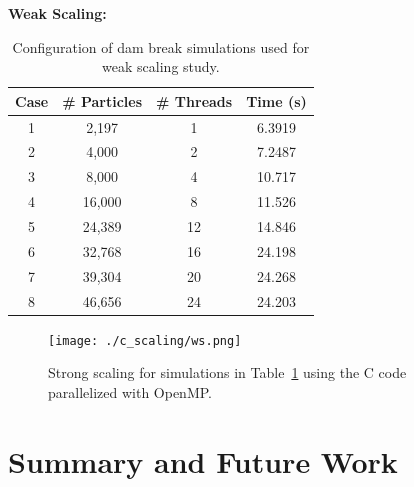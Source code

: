 \documentclass{scrartcl}
\begin{document}
    \textbf{Weak Scaling:}
    \begin{table}
    	\begin{center}
    		\begin{tabular}{| c | c | c | c |}
    			\hline
    			Case & \# Particles & \# Threads & Time (s) \\ \hline
    			1 &  2,197 &  1 & 6.3919 \\ \hline		  		
    			2 &  4,000 &  2 & 7.2487 \\ \hline		  		
    			3 &  8,000 &  4 & 10.717 \\ \hline		  		
    			4 & 16,000 &  8 & 11.526 \\ \hline		  		
    			5 & 24,389 & 12 & 14.846 \\ \hline		  		
    			6 & 32,768 & 16 & 24.198 \\ \hline		  		
    			7 & 39,304 & 20 & 24.268 \\ \hline		  		
    			8 & 46,656 & 24 & 24.203 \\ \hline		  		
    		\end{tabular}
    		\caption{Configuration of dam break simulations used for weak scaling study.}
    		\label{tab:cws}
    	\end{center}
    \end{table}
    
    \begin{figure}
    	\begin{center}
    		\texttt{[image: ./c\_scaling/ws.png]}
    		\caption{Strong scaling for simulations in Table~\ref{tab:cws} using the C code parallelized with OpenMP.}
    		\label{fig:ws_c_omp}
    	\end{center}
    \end{figure}
    
  
    \section{Summary and Future Work}
\end{document}
